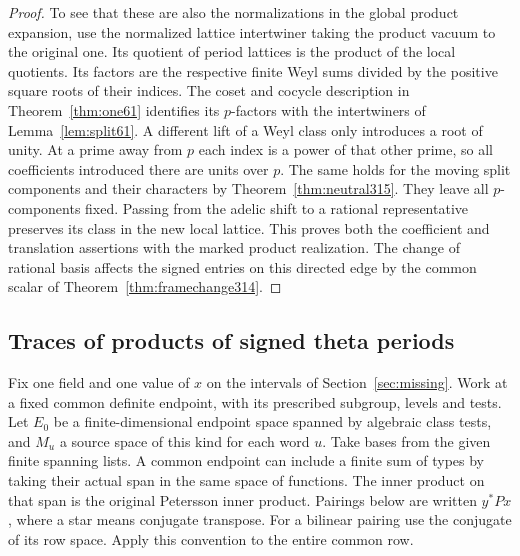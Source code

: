 \documentclass[a4paper,11pt]{article}
\theoremstyle{definition}
\theoremstyle{remark}
\numberwithin{equation}{section}
\begin{document}
\begin{proof}
To see that these are also the normalizations in the global
product expansion, use the normalized lattice intertwiner taking
the product vacuum to the original one. Its quotient of period
lattices is the product of the local quotients. Its factors are
the respective finite Weyl sums divided by the positive square
roots of their indices. The coset and cocycle description in
Theorem~\ref{thm:one61} identifies its \(p\)-factors with the
intertwiners of Lemma~\ref{lem:split61}. A different lift of a
Weyl class only introduces a root of unity. At a prime away
from \(p\) each index is a power of that other prime, so all
coefficients introduced there are units over \(p\). The same
holds for the moving split components and their characters by
Theorem~\ref{thm:neutral315}. They leave all \(p\)-components
fixed. Passing from the adelic shift to a rational representative
preserves its class in the new local lattice. This proves both
the coefficient and translation assertions with the marked
product realization. The change of rational basis affects the
signed entries on this directed edge by the common scalar of
Theorem~\ref{thm:framechange314}.
\end{proof}

\subsection{Traces of products of signed theta periods}\label{nav:V-63}
Fix one field and one value of \(x\) on the intervals of
Section~\ref{sec:missing}. Work at a fixed common definite
endpoint, with its prescribed subgroup, levels and tests.
Let \(E_0\) be a finite-dimensional endpoint space spanned
by algebraic class tests, and \(M_u\) a source space of this
kind for each word \(u\). Take bases from the given finite
spanning lists. A common endpoint can include a finite sum
of types by taking their actual span in the same space of
functions. The inner product on that span is the original
Petersson inner product. Pairings below are written \(y^*P x\),
where a star means conjugate transpose. For a bilinear
pairing use the conjugate of its row space. Apply this
convention to the entire common row.
\end{document}
